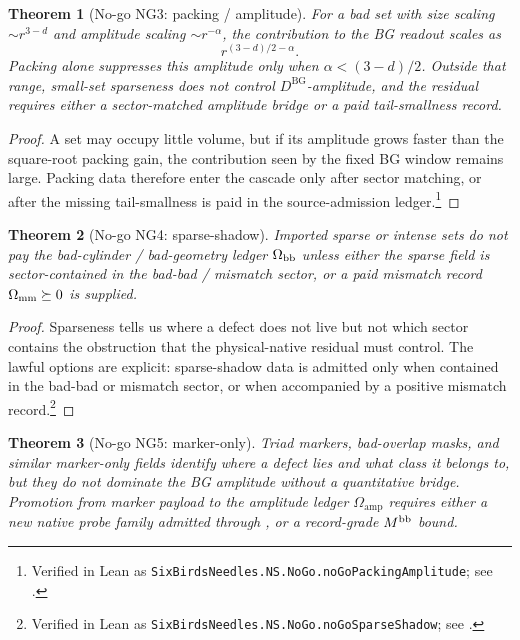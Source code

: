 \documentclass[11pt]{article}
\newcommand{\DBG}{D^{\mathrm{BG}}}
\newcommand{\Omamp}{\Omega_{\mathrm{amp}}}
\newtheorem{theorem}{Theorem}[section]
\theoremstyle{definition}
\begin{document}
\begin{theorem}[No-go NG3: packing / amplitude]
\label{thm:ns:no-go-packing-amplitude}
For a bad set with size scaling \(\sim r^{3-d}\) and amplitude scaling
\(\sim r^{-\alpha}\), the contribution to the BG readout scales as
\[
  r^{(3-d)/2-\alpha}.
\]
Packing alone suppresses this amplitude only when
\(\alpha < (3-d)/2\).  Outside that range, small-set sparseness does
not control \(\DBG\)-amplitude, and the residual requires either a
sector-matched amplitude bridge or a paid tail-smallness record.
\end{theorem}

\begin{proof}
A set may occupy little volume, but if its amplitude grows faster
than the square-root packing gain, the contribution seen by the fixed
BG window remains large.  Packing data therefore enter the cascade
only after sector matching, or after the missing tail-smallness is
paid in the source-admission ledger.\footnote{Verified in Lean as \texttt{SixBirdsNeedles.NS.NoGo.noGoPackingAmplitude}; see .}
\end{proof}

\begin{theorem}[No-go NG4: sparse-shadow]
\label{thm:ns:no-go-sparse-shadow}
Imported sparse or intense sets do not pay the bad-cylinder /
bad-geometry ledger \(\Omega_{\rm bb}\) unless either the sparse field
is sector-contained in the bad-bad / mismatch sector, or a paid mismatch
record \(\Omega_{\rm mm}\succeq 0\) is supplied.
\end{theorem}

\begin{proof}
Sparseness tells us where a defect does not live but not which sector
contains the obstruction that the physical-native residual must
control.  The lawful options are explicit: sparse-shadow data is
admitted only when contained in the bad-bad or mismatch sector, or
when accompanied by a positive mismatch record.\footnote{Verified in Lean as \texttt{SixBirdsNeedles.NS.NoGo.noGoSparseShadow}; see .}
\end{proof}

\begin{theorem}[No-go NG5: marker-only]
\label{thm:ns:no-go-marker-only}
Triad markers, bad-overlap masks, and similar marker-only fields identify
where a defect lies and what class it belongs to, but they do not
dominate the BG amplitude without a quantitative bridge.  Promotion from
marker payload to the amplitude ledger \(\Omamp\) requires either a new
native probe family admitted through
, or a record-grade
\(M^{\rm bb}\) bound.
\end{theorem}
\end{document}

